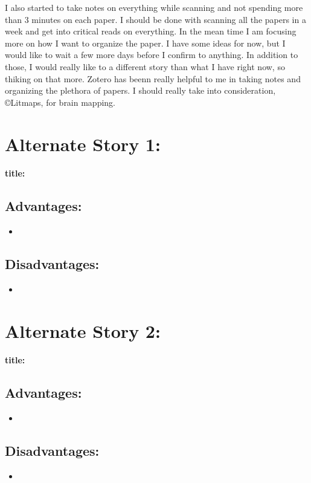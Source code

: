 \documentclass{article}
\begin{document}
I also started to take notes on everything while scanning and not spending more than 3 minutes on each paper. I should be done with scanning all the papers in a week and get into critical reads on everything. In the mean time I am focusing more on how I want to organize the paper. 
I have some ideas for now, but I would like to wait a few more days before I confirm to anything. In addition to those, I would really like to a different story than what I have right now, so thiking on that more. 
Zotero has beenn really helpful to me in taking notes and organizing the plethora of papers. I should really take into consideration, \copyright Litmaps, for brain mapping. 

\section*{Alternate Story 1:}
\paragraph*{title:}
\subsection*{Advantages: }
\begin{itemize}
    \item 
\end{itemize}
\subsection*{Disadvantages: }
\begin{itemize}
    \item 
\end{itemize}
\section*{Alternate Story 2:}
\paragraph*{title:}
\subsection*{Advantages: }
\begin{itemize}
    \item 
\end{itemize}
\subsection*{Disadvantages:}
\begin{itemize}
    \item 
\end{itemize}
\end{document}
